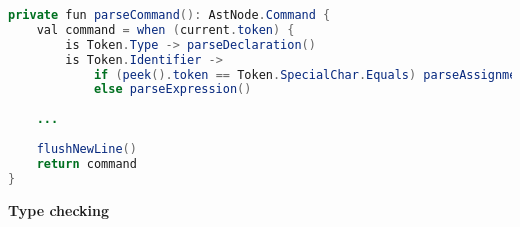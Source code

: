 \begin{lstlisting}[language=java,label=lis:parseCommand,caption=A simplified version of the parse declaration method from the parser.]
private fun parseCommand(): AstNode.Command {
    val command = when (current.token) {
	    is Token.Type -> parseDeclaration()
	    is Token.Identifier ->
		    if (peek().token == Token.SpecialChar.Equals) parseAssignment() 
		    else parseExpression()
    
    ...
    
    flushNewLine()
    return command
}
\end{lstlisting}


\textbf{Type checking}

